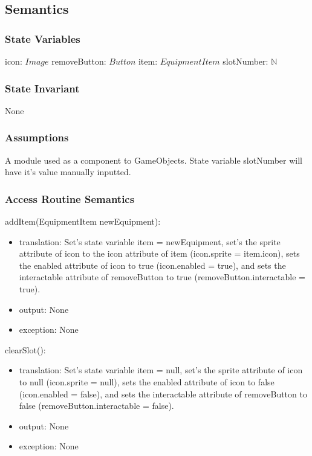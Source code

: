 \documentclass[12pt]{article}
\begin{document}
\subsection* {Semantics}

\subsubsection* {State Variables}

icon: $Image$
removeButton: $Button$
item: $EquipmentItem$
slotNumber: $\mathbb{N}$

\subsubsection* {State Invariant}

None

\subsubsection* {Assumptions}

A module used as a component to GameObjects. State variable slotNumber will have it's value manually inputted.

\subsubsection* {Access Routine Semantics}

\noindent addItem(EquipmentItem newEquipment):
\begin{itemize}
\item translation: Set's state variable item = newEquipment, set's the sprite attribute of icon to the icon attribute of item (icon.sprite = item.icon), sets the enabled attribute of icon to true (icon.enabled = true), and sets the interactable attribute of removeButton to true (removeButton.interactable = true).
\item output: None
\item exception: None
\end{itemize}

\noindent clearSlot():
\begin{itemize}
\item translation: Set's state variable item = null, set's the sprite attribute of icon to null (icon.sprite = null), sets the enabled attribute of icon to false (icon.enabled = false), and sets the interactable attribute of removeButton to false (removeButton.interactable = false).
\item output: None
\item exception: None
\end{itemize}
\end{document}
